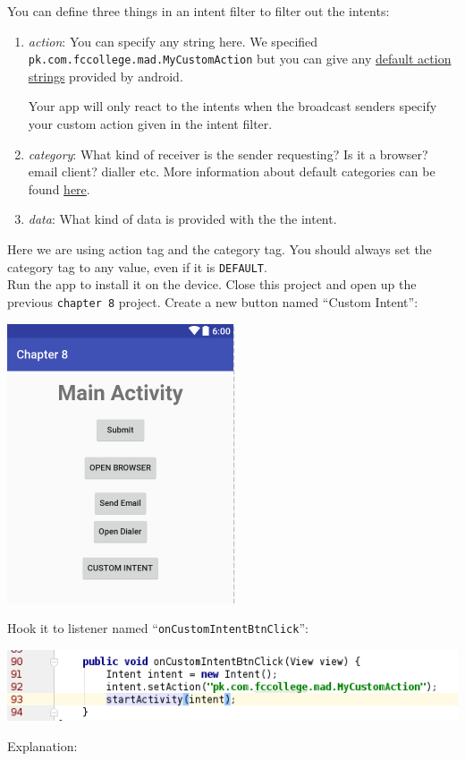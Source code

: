 You can define three things in an intent filter to filter out the intents:

\begin{enumerate}
	\item \textit{action}: You can specify any string here. We specified \texttt{pk.com.fccollege.mad.MyCustomAction} but you can give any \href{https://developer.android.com/reference/android/content/Intent.html#constants}{default action strings} provided by android. 
	
	Your app will only react to the intents when the broadcast senders specify your custom action given in the intent filter.
	
	\item \textit{category}: What kind of receiver is the sender requesting? Is it a browser? email client? dialler etc. More information about default categories can be found \href{https://developer.android.com/reference/android/content/Intent.html#CATEGORY_APP_BROWSER}{here}.
	
	\item \textit{data}: What kind of data is provided with the the intent. \\
	
\end{enumerate}

Here we are using action tag and the category tag. You should always set the category tag to any value, even if it is \texttt{DEFAULT}. \\

Run the app to install it on the device. Close this project and open up the previous \texttt{chapter 8} project. Create a new button named ``Custom Intent'':

\begin{center}
	\includegraphics[scale=0.4]{chapters/ch09/images/35}
\end{center}

Hook it to listener named ``\texttt{onCustomIntentBtnClick}'':

\begin{center}
	\includegraphics[scale=0.4]{chapters/ch09/images/36}
\end{center}

Explanation: